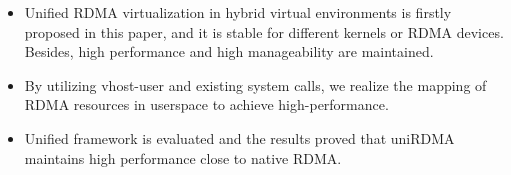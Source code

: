 \begin{itemize}
\item Unified RDMA virtualization in hybrid virtual environments is firstly proposed in this paper, and it is stable for different kernels or RDMA devices. Besides, high performance and high manageability are maintained.  

\item By utilizing vhost-user and existing system calls, we realize the mapping of RDMA resources in userspace to achieve high-performance.  

\item Unified framework is evaluated and the results proved that uniRDMA maintains high performance close to native RDMA.
\end{itemize}

